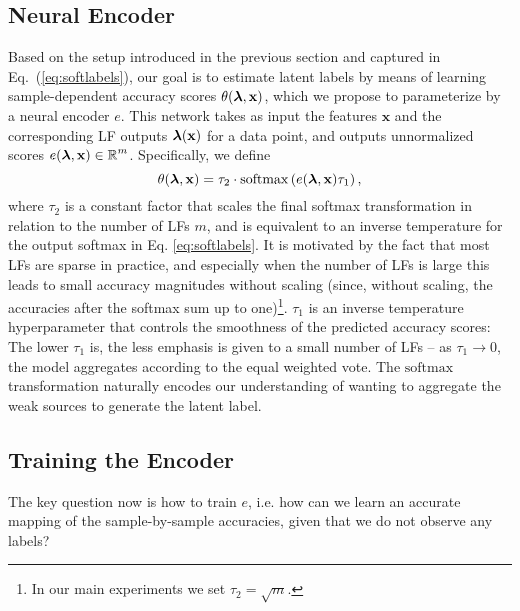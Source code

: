 \documentclass{article}
\newcommand{\softmax}{\mathrm{softmax}}
\newcommand{\encoder}{$e $}
\newcommand{\features}{\mathbf{x}}
\begin{document}
\subsection{Neural Encoder}
Based on the setup introduced in the previous section and captured in Eq.~(\ref{eq:softlabels}), our goal is to estimate latent labels by means of learning sample-dependent accuracy scores $\theta(\lfs, \features)$, which we propose to parameterize by a neural encoder \encoder. This network takes as input the features $\features$ and the corresponding LF outputs $\lfs(\features)$ for a data point, and outputs unnormalized scores $e(\lfs, \features)\in \R^{m}$.
Specifically, we define
\begin{equation}
    \theta(\lfs, \features) = \tau_2 \cdot \softmax \brackets{e(\lfs, \features) \tau_1},
    \label{eq:AccuracyScores}
\end{equation}
where $\tau_2$ is a constant factor that scales the final softmax transformation in relation to the number of LFs $m$, and is equivalent to an inverse temperature for the output softmax in Eq. \ref{eq:softlabels}. It is motivated by the fact that most LFs are sparse in practice, and especially when the number of LFs is large this leads to small accuracy magnitudes without scaling (since, without scaling, the accuracies after the softmax sum up to one)\footnote{In our main experiments we set $\tau_2=\sqrt{m}$.}. $\tau_1$ is an inverse temperature hyperparameter that controls the smoothness of the predicted accuracy scores: The lower $\tau_1$ is, the less emphasis is given to a small number of LFs --  as $\tau_1 \rightarrow 0$, the model aggregates according to the equal weighted vote. 
The $\softmax$ transformation naturally encodes our understanding of wanting to aggregate the weak sources to generate the latent label. 

\subsection{Training the Encoder}
The key question now is how to train \encoder, i.e. how can we learn an accurate mapping of the sample-by-sample accuracies, given that we do not observe any labels? 
\end{document}

